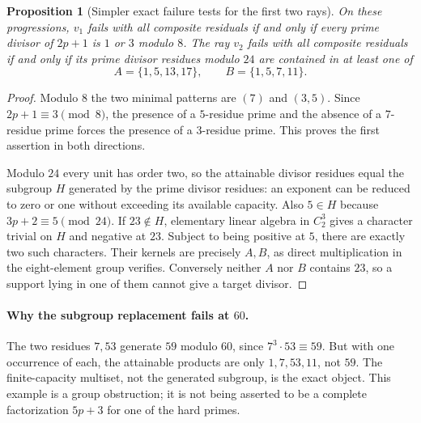 \documentclass[11pt]{article}
\newtheorem{proposition}[theorem]{Proposition}
\theoremstyle{remark}\newtheorem{remark}[theorem]{Remark}
\begin{document}
\begin{proposition}[Simpler exact failure tests for the first two rays]\label{prop:failure}
On these progressions, $v_1$ fails with all composite residuals if and only if every prime divisor of $2p+1$ is $1$ or $3$ modulo $8$. The ray $v_2$ fails with all composite residuals if and only if its prime divisor residues modulo $24$ are contained in at least one of
\[
 A=\{1,5,13,17\},\qquad B=\{1,5,7,11\}.
\]
\end{proposition}
\begin{proof}
Modulo $8$ the two minimal patterns are $(7)$ and $(3,5)$. Since $2p+1\equiv3\pmod8$, the presence of a $5$-residue prime and the absence of a $7$-residue prime forces the presence of a $3$-residue prime. This proves the first assertion in both directions.

Modulo $24$ every unit has order two, so the attainable divisor residues equal the subgroup $H$ generated by the prime divisor residues: an exponent can be reduced to zero or one without exceeding its available capacity. Also $5\in H$ because $3p+2\equiv5\pmod{24}$. If $23\notin H$, elementary linear algebra in $C_2^3$ gives a character trivial on $H$ and negative at $23$. Subject to being positive at $5$, there are exactly two such characters. Their kernels are precisely $A,B$, as direct multiplication in the eight-element group verifies. Conversely neither $A$ nor $B$ contains $23$, so a support lying in one of them cannot give a target divisor.
\end{proof}

\paragraph{Why the subgroup replacement fails at $60$.}
The two residues $7,53$ generate $59$ modulo $60$, since $7^3\cdot53\equiv59$. But with one occurrence of each, the attainable products are only $1,7,53,11$, not $59$. The finite-capacity multiset, not the generated subgroup, is the exact object. This example is a group obstruction; it is not being asserted to be a complete factorization $5p+3$ for one of the hard primes.
\end{document}
